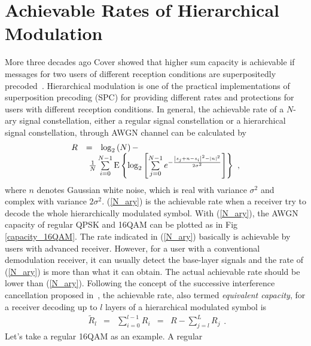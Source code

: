 \documentclass[10pt,fleqn, twocolumn]{IEEEtran}
\begin{document}
\section{Achievable Rates of Hierarchical Modulation~\label{Info_Theory}}
More three decades ago Cover showed that higher sum capacity is
achievable if messages for two users of different reception
conditions are superpositedly precoded~\cite{Cover72}.
Hierarchical modulation is one of the practical implementations of
superposition precoding (SPC) for providing different rates and
protections for users with different reception conditions. In
general, the achievable rate of a $N$-ary signal constellation,
either a regular signal constellation or a hierarchical signal
constellation, through AWGN channel can be calculated
by~\cite{Unge82}
\begin{equation}
\begin{array}{lcl}
R&=&\log_{2}\left(N\right)-\\
&&\hspace{-0.20in}\frac{1}{N}\sum\limits_{i=0}^{N-1}\mbox{E}\left\{\log_{2}\left[\sum\limits_{j=0}^{N-1}e^{-\frac{\left|s_{j}+n-s_{i}\right|^2-\left|n\right|^2}{2\sigma^2}}\right]\right\}\
,
\end{array}\label{N_ary}
\end{equation}
\noindent where $n$ denotes Gaussian white noise, which is real
with variance $\sigma^2$ and complex with variance $2\sigma^2$.
(\ref{N_ary}) is the achievable rate when a receiver try to decode
the whole hierarchically modulated symbol. With (\ref{N_ary}), the
AWGN capacity of regular QPSK and 16QAM can be plotted as in Fig
\ref{capacity_16QAM}. The rate indicated in (\ref{N_ary})
basically is achievable by users with advanced receiver. However,
for a user with a conventional demodulation receiver, it can
usually detect the base-layer signals and the rate of
(\ref{N_ary}) is more than what it can obtain. The actual
achievable rate should be lower than (\ref{N_ary}). Following the
concept of the successive interference cancellation proposed
in~\cite{Cover72}, the achievable rate, also termed {\em
equivalent capacity}, for a receiver decoding up to $l$ layers of
a hierarchical modulated symbol is~\cite{Huber94}
\begin{equation}
\begin{array}{rcccl}
\tilde{R}_{l}&=&\sum\limits_{i=0}^{l-1}R_{i}& = &
R-\sum\limits_{j=l}^{L}{R}_{j}
\end{array}.\label{R_equiv}
\end{equation}
\noindent Let's take a regular 16QAM as an example. A regular
\end{document}

